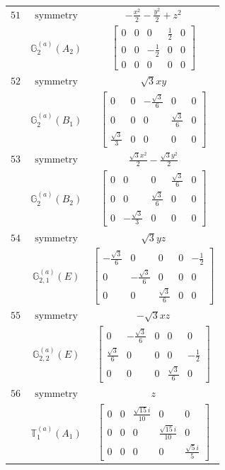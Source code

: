 \documentclass[fleqn,8pt,landscape]{jsarticle}
\begin{document}
\begin{longtable}{ccc}
$ 51 $ & $ \text{symmetry} $ & $ - \frac{x^{2}}{2} - \frac{y^{2}}{2} + z^{2} $ \\
$  $ & $ \mathbb{G}_{2}^{(a)}(A_{2}) $ & $ \begin{bmatrix} 0 & 0 & 0 & \frac{1}{2} & 0 \\ 0 & 0 & - \frac{1}{2} & 0 & 0 \\ 0 & 0 & 0 & 0 & 0 \end{bmatrix} $ \\ \hline
$ 52 $ & $ \text{symmetry} $ & $ \sqrt{3} x y $ \\
$  $ & $ \mathbb{G}_{2}^{(a)}(B_{1}) $ & $ \begin{bmatrix} 0 & 0 & - \frac{\sqrt{3}}{6} & 0 & 0 \\ 0 & 0 & 0 & \frac{\sqrt{3}}{6} & 0 \\ \frac{\sqrt{3}}{3} & 0 & 0 & 0 & 0 \end{bmatrix} $ \\ \hline
$ 53 $ & $ \text{symmetry} $ & $ \frac{\sqrt{3} x^{2}}{2} - \frac{\sqrt{3} y^{2}}{2} $ \\
$  $ & $ \mathbb{G}_{2}^{(a)}(B_{2}) $ & $ \begin{bmatrix} 0 & 0 & 0 & \frac{\sqrt{3}}{6} & 0 \\ 0 & 0 & \frac{\sqrt{3}}{6} & 0 & 0 \\ 0 & - \frac{\sqrt{3}}{3} & 0 & 0 & 0 \end{bmatrix} $ \\ \hline
$ 54 $ & $ \text{symmetry} $ & $ \sqrt{3} y z $ \\
$  $ & $ \mathbb{G}_{2,1}^{(a)}(E) $ & $ \begin{bmatrix} - \frac{\sqrt{3}}{6} & 0 & 0 & 0 & - \frac{1}{2} \\ 0 & - \frac{\sqrt{3}}{6} & 0 & 0 & 0 \\ 0 & 0 & \frac{\sqrt{3}}{6} & 0 & 0 \end{bmatrix} $ \\ \hline
$ 55 $ & $ \text{symmetry} $ & $ - \sqrt{3} x z $ \\
$  $ & $ \mathbb{G}_{2,2}^{(a)}(E) $ & $ \begin{bmatrix} 0 & - \frac{\sqrt{3}}{6} & 0 & 0 & 0 \\ \frac{\sqrt{3}}{6} & 0 & 0 & 0 & - \frac{1}{2} \\ 0 & 0 & 0 & \frac{\sqrt{3}}{6} & 0 \end{bmatrix} $ \\ \hline
$ 56 $ & $ \text{symmetry} $ & $ z $ \\
$  $ & $ \mathbb{T}_{1}^{(a)}(A_{1}) $ & $ \begin{bmatrix} 0 & 0 & \frac{\sqrt{15} i}{10} & 0 & 0 \\ 0 & 0 & 0 & \frac{\sqrt{15} i}{10} & 0 \\ 0 & 0 & 0 & 0 & \frac{\sqrt{5} i}{5} \end{bmatrix} $ \\ \hline

\end{longtable}
\end{document}
